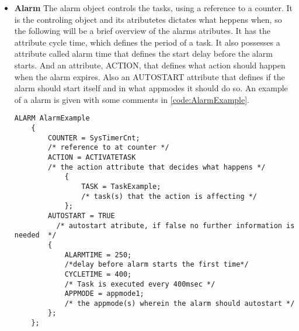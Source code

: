 \begin{itemize}
    \item{\textbf{Alarm}}
    The alarm object controls the tasks, using a reference to a counter. It is the controling object and its atributetes dictates what heppens when, so the following will be a brief overview of the alarms atributes. It has the attribute cycle time, which defines the period of a task. It also possesses a attribute called alarm time that defines the start delay before the alarm starts. And an attribute, ACTION, that defines what action should happen when the alarm expires. Also an AUTOSTART attribute that defines if the alarm should start itself and in what appmodes it should do so.  An example of a alarm is given with some comments in \ref{code:AlarmExample}.
    
    \begin{lstlisting}[frame=single, label={code:AlarmExample}, caption={A example of an alarm in OIL}, xleftmargin=.00\textwidth, xrightmargin=.00\textwidth]
    ALARM AlarmExample
    {
        COUNTER = SysTimerCnt;
        /* reference to at counter */
        ACTION = ACTIVATETASK 
        /* the action attribute that decides what happens */
            {
                TASK = TaskExample;
                /* task(s) that the action is affecting */
            };
        AUTOSTART = TRUE
          /* autostart atribute, if false no further information is needed  */
        { 
            ALARMTIME = 250;
            /*delay before alarm starts the first time*/
            CYCLETIME = 400; 
            /* Task is executed every 400msec */
            APPMODE = appmode1;
            /* the appmode(s) wherein the alarm should autostart */
        };
    };
    \end{lstlisting}
\end{itemize}

